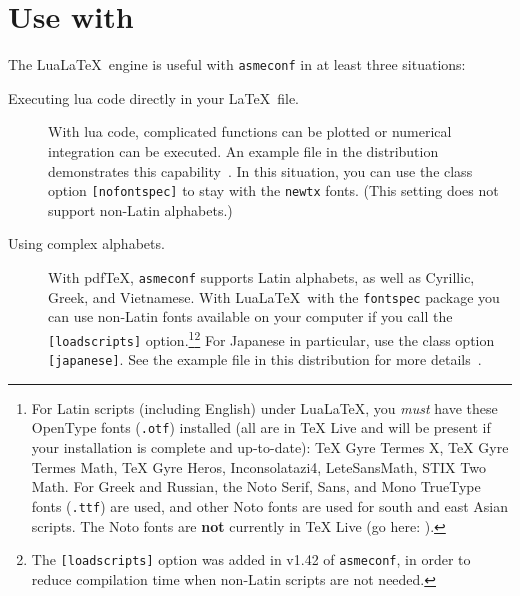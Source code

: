 \documentclass[colorlinks,upint,subscriptcorrection,varvw,hyphenate,balance,greek,russian,vietnamese,german]{asmeconf} %
\newcommand*\pdfTeX{pdf\TeX}
\newcommand*\LuaLaTeX{Lua\LaTeX}
\begin{document}
\section[Use with LuaLaTeX]{Use with  }\label{appendix:b}

The \LuaLaTeX\  engine is useful with \texttt{asmeconf} in at least three situations:

\begin{description}

\item[Executing lua code directly in your \LaTeX\ file.] With lua code, complicated functions can be plotted or numerical integration can be executed. An example file in the distribution demonstrates this capability~\cite{lienhard2025}. In this situation, you can use the class option \texttt{[nofontspec]} to stay with the \texttt{newtx} fonts. (This setting does not support non-Latin alphabets.)

\item[Using complex alphabets.] With \pdfTeX, \texttt{asmeconf} supports Latin alphabets, as well as Cyrillic, Greek, and Vietnamese. With \LuaLaTeX\  with the \texttt{fontspec} package you can use non-Latin fonts available on your computer if you call the \texttt{[loadscripts]} option.\footnote{For Latin scripts (including English) under \LuaLaTeX, you \emph{must} have these OpenType fonts (\texttt{.otf}) installed (all are in TeX Live and will be present if your installation is complete and up-to-date): TeX Gyre Termes X, TeX Gyre Termes Math, TeX Gyre Heros, Inconsolatazi4, LeteSansMath, STIX Two Math. For Greek and Russian, the Noto Serif, Sans, and Mono TrueType fonts (\texttt{.ttf}) are used, and other Noto fonts are used for south and east Asian scripts. The Noto fonts are \textbf{not} currently in TeX Live (go here: ).}\footnote{The \texttt{[loadscripts]} option was added in v1.42 of \texttt{asmeconf}, in order to reduce compilation time when non-Latin scripts are not needed.}   For Japanese in particular, use the class option \texttt{[japanese]}. See the example file in this distribution for more details~\cite{lienhard2021}.


\end{description}
\end{document}
